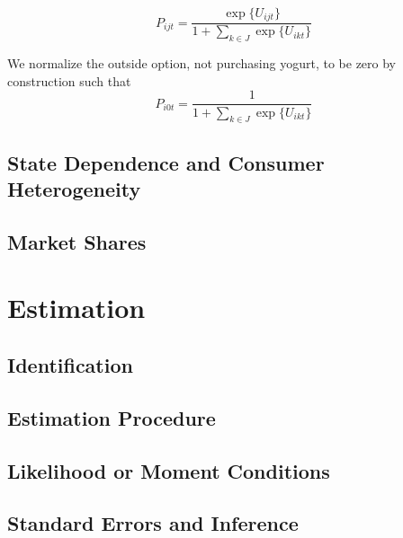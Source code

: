 \begin{equation}
\label{eq:choice-probability}
  P_{ijt} = \frac{\exp\{U_{ijt}\}}{1+\sum_{k\in J}\exp\{U_{ikt}\}}
\end{equation}

We normalize the outside option, not purchasing yogurt, to be zero by construction such that 
\begin{equation}
  P_{i0t} = \frac{1}{1 + \sum_{k\in J}\exp\{U_{ikt}\}}
\end{equation}

\subsection{State Dependence and Consumer Heterogeneity}

\subsection{Market Shares}



\section{Estimation}
\label{sec:estimation}

\subsection{Identification}
\label{subsec:identification}

\subsection{Estimation Procedure}
\label{subsec:estimation-procedure}

\subsection{Likelihood or Moment Conditions}

%

\subsection{Standard Errors and Inference}


